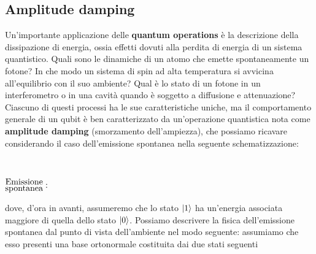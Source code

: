 \vspace{1cm}
\noindent{}

\subsection{Amplitude damping}
Un'importante applicazione delle \textbf{quantum operations} è la descrizione della dissipazione di energia, ossia effetti dovuti alla perdita di energia di un sistema quantistico. Quali sono le dinamiche di un atomo che emette spontaneamente un fotone? In che modo un sistema di spin ad alta temperatura si avvicina all'equilibrio con il suo ambiente? Qual è lo stato di un fotone in un interferometro o in una cavità quando è soggetto a diffusione e attenuazione? Ciascuno di questi processi ha le sue caratteristiche uniche, ma il comportamento generale di un qubit è ben caratterizzato da un'operazione quantistica nota come \textbf{amplitude damping} (smorzamento dell'ampiezza), che possiamo ricavare considerando il caso dell'emissione spontanea nella seguente schematizzazione:
\begin{center}
    $
        \begin{matrix}
             \\
             \\
            \begin{Large}\substack{\text{Emissione} \\ \text{spontanea}}\end{Large}: \\
        \end{matrix}
        $
\end{center}
\vspace{0.2cm}
dove, d'ora in avanti, assumeremo che lo stato $\ket{1}$ ha un'energia associata maggiore di quella dello stato $\ket{0}$. Possiamo descrivere la fisica dell’emissione spontanea dal punto di vista dell’ambiente nel modo seguente: assumiamo che esso presenti una base ortonormale costituita dai due stati seguenti
